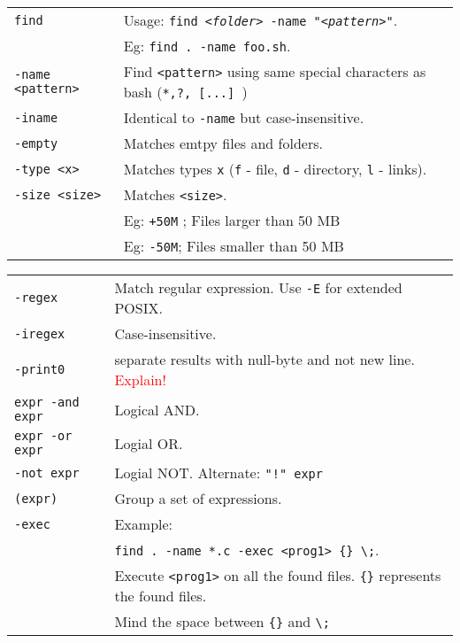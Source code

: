 \begin{tabularx}{\linewidth}{lX}
\texttt{find} & Usage: \texttt{find \textit{<folder>} -name "\textit{<pattern>}"}.\\
& Eg: \texttt{find . -name foo.sh}.\\
\texttt{-name <pattern>} & Find \texttt{<pattern>} using same special characters as bash (\texttt{*,?, [...] })\\
\texttt{-iname} & Identical to \texttt{-name} but case-insensitive.\\
\texttt{-empty} & Matches emtpy files and folders.\\
\texttt{-type <x>} & Matches types \texttt{x} (\texttt{f} - file, \texttt{d} - directory, \texttt{l} - links).\\
\texttt{-size <size>} & Matches \texttt{<size>}.\\
&  Eg: \texttt{+50M} ; Files larger than 50 MB\\
& Eg: \texttt{-50M}; Files smaller than 50 MB\\
\end{tabularx}

\begin{tabularx}{\linewidth}{lX}

\texttt{-regex} & Match regular expression. Use \texttt{-E} for extended POSIX.\\
\texttt{-iregex} & Case-insensitive.\\
\texttt{-print0} & separate results with null-byte and not new line. 
\textcolor{red}{Explain!}\\
\texttt{expr -and expr} & Logical AND.\\
\texttt{expr -or expr} & Logial OR.\\
\texttt{-not expr} & Logial NOT. Alternate: \texttt{"!" expr}\\
\texttt{(expr)} & Group a set of expressions.\\
\texttt{-exec} & Example: \\
 & \texttt{find . -name *.c -exec <prog1> \{\} \textbackslash ;}.\\
 & Execute \texttt{<prog1>} on all the found files. \texttt{\{\}} represents the found files. \\
 & Mind the space between \texttt{\{\}} and \texttt{\textbackslash;}\\
 
\hline

\end{tabularx}




